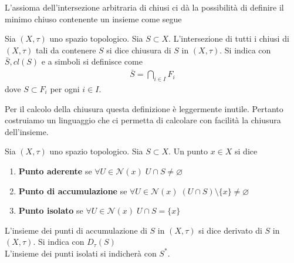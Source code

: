 L'assioma dell'intersezione arbitraria di chiusi ci dà la possibilità di definire il minimo chiuso contenente un insieme come segue
\begin{definition}
	Sia $(X, \tau)$ uno spazio topologico. Sia $S \subset X$. L'intersezione di tutti i chiusi di $(X,\tau)$ tali da contenere $S$ si dice chiusura di $S$ in $(X, \tau)$. Si indica con $\bar{S}, cl(S)$ e a simboli si definisce come 
	\begin{equation}
	\begin{aligned}
		\bar{S} = \bigcap_{i \in I} F_i
	\end{aligned}
	\end{equation}
	dove $S \subset F_i$ per ogni $i \in I$.
\end{definition}
Per il calcolo della chiusura questa definizione è leggermente inutile. Pertanto costruiamo un linguaggio che ci permetta di calcolare con facilità la chiusura dell'insieme.
\begin{definition}
		Sia $(X, \tau)$ uno spazio topologico. Sia $S \subset X$. Un punto $x \in X$ si dice
	\begin{enumerate}
		\item \textbf{Punto aderente} se $\forall U \in \mathcal{N}(x) \; U \cap S \neq \varnothing$
		\item \textbf{Punto di accumulazione} se $\forall U \in \mathcal{N}(x) \; (U \cap S) \setminus \{x\} \neq \varnothing$
		\item \textbf{Punto isolato} se $\forall U \in \mathcal{N}(x) \; U \cap S = \{x\}$
	\end{enumerate}
\end{definition}

\begin{definition}
	L'insieme dei punti di accumulazione di $S$ in $(X,\tau)$ si dice derivato di $S$ in $(X, \tau)$. Si indica con $D_\tau (S)$\\
	L'insieme dei punti isolati si indicherà con $S^*$.
\end{definition}

